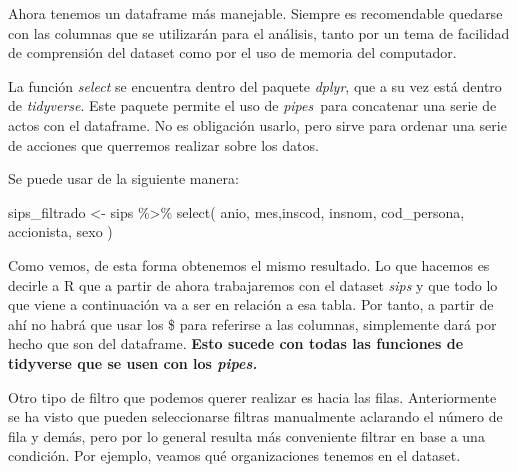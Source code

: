 \documentclass[
  letterpaper,
  DIV=11,
  numbers=noendperiod]{scrreprt}
\newenvironment{Shaded}{\begin{snugshade}}{\end{snugshade}}
\newcommand{\FunctionTok}[1]{\textcolor[rgb]{0.28,0.35,0.67}{#1}}
\newcommand{\NormalTok}[1]{\textcolor[rgb]{0.00,0.23,0.31}{#1}}
\newcommand{\OtherTok}[1]{\textcolor[rgb]{0.00,0.23,0.31}{#1}}
\newcommand{\SpecialCharTok}[1]{\textcolor[rgb]{0.37,0.37,0.37}{#1}}
\begin{document}
Ahora tenemos un dataframe más manejable. Siempre es recomendable
quedarse con las columnas que se utilizarán para el análisis, tanto por
un tema de facilidad de comprensión del dataset como por el uso de
memoria del computador.

La función \emph{select} se encuentra dentro del paquete \emph{dplyr},
que a su vez está dentro de \emph{tidyverse}. Este paquete permite el
uso de \emph{pipes}~para concatenar una serie de actos con el dataframe.
No es obligación usarlo, pero sirve para ordenar una serie de acciones
que querremos realizar sobre los datos.

Se puede usar de la siguiente manera:

\begin{Shaded}
\begin{Highlighting}[]
\NormalTok{sips\_filtrado }\OtherTok{\textless{}{-}}\NormalTok{ sips }\SpecialCharTok{\%\textgreater{}\%} 
  \FunctionTok{select}\NormalTok{(}
\NormalTok{    anio, mes,inscod, insnom, cod\_persona, accionista, sexo}
\NormalTok{  )}
\end{Highlighting}
\end{Shaded}

Como vemos, de esta forma obtenemos el mismo resultado. Lo que hacemos
es decirle a R que a partir de ahora trabajaremos con el dataset
\emph{sips} y que todo lo que viene a continuación va a ser en relación
a esa tabla. Por tanto, a partir de ahí no habrá que usar los \$ para
referirse a las columnas, simplemente dará por hecho que son del
dataframe. \textbf{Esto sucede con todas las funciones de tidyverse que
se usen con los \emph{pipes.}}

Otro tipo de filtro que podemos querer realizar es hacia las filas.
Anteriormente se ha visto que pueden seleccionarse filtras manualmente
aclarando el número de fila y demás, pero por lo general resulta más
conveniente filtrar en base a una condición. Por ejemplo, veamos qué
organizaciones tenemos en el dataset.

\begin{Shaded}
\end{Shaded}
\end{document}
